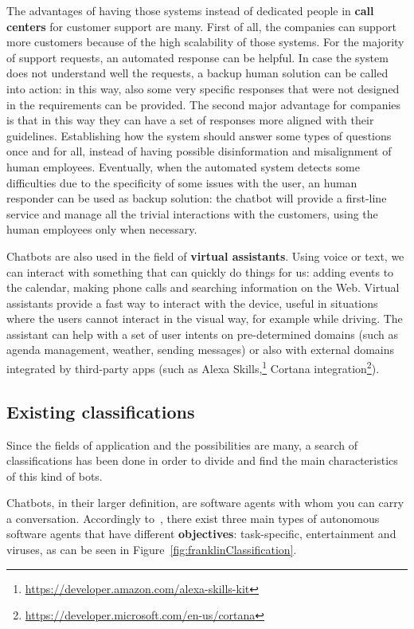 The advantages of having those systems instead of dedicated people in \textbf{call centers} for customer support are many. First of all, the companies can support more customers because of the high scalability of those systems. For the majority of support requests, an automated response can be helpful. In case the system does not understand well the requests, a backup human solution can be called into action: in this way, also some very specific responses that were not designed in the requirements can be provided. The second major advantage for companies is that in this way they can have a set of responses more aligned with their guidelines. Establishing how the system should answer some types of questions once and for all, instead of having possible disinformation and misalignment of human employees. Eventually, when the automated system detects some difficulties due to the specificity of some issues with the user, an human responder can be used as backup solution: the chatbot will provide a first-line service and manage all the trivial interactions with the customers, using the human employees only when necessary.

Chatbots are also used in the field of \textbf{virtual assistants}. Using voice or text, we can interact with something that can quickly do things for us: adding events to the calendar, making phone calls and searching information on the Web. Virtual assistants provide a fast way to interact with the device, useful in situations where the users cannot interact in the visual way, for example while driving. The assistant can help with a set of user intents on pre-determined domains (such as agenda management, weather, sending messages) or also with external domains integrated by third-party apps (such as Alexa Skills,\footnote{\url{https://developer.amazon.com/alexa-skills-kit}} Cortana integration\footnote{\url{https://developer.microsoft.com/en-us/cortana}}).

\subsection{Existing classifications}
\label{soaClassificationsExisting}

Since the fields of application and the possibilities are many, a search of classifications has been done in order to divide and find the main characteristics of this kind of bots.

Chatbots, in their larger definition, are software agents with whom you can carry a conversation. Accordingly to~\cite{franklin1996agent}, there exist three main types of autonomous software agents that have different \textbf{objectives}: task-specific, entertainment and viruses, as can be seen in Figure~\ref{fig:franklinClassification}.

